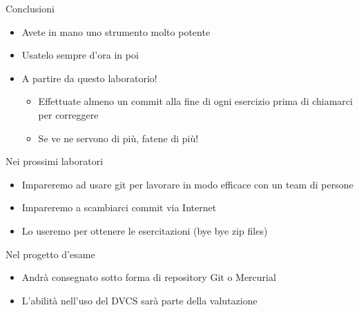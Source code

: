 \documentclass[xcolor=dvipsnames,presentation]{beamer}
\begin{document}
\begin{frame}{Conclusioni}
	\begin{itemize}
		\item Avete in mano uno strumento molto potente
		\item Usatelo sempre d'ora in poi
		\item A partire da questo laboratorio!
		\begin{itemize}
			\item Effettuate almeno un commit alla fine di ogni esercizio prima di chiamarci per correggere
			\item Se ve ne servono di più, fatene di più!
		\end{itemize}
	\end{itemize}
	\begin{block}{Nei prossimi laboratori}
		\begin{itemize}
			\item Impareremo ad usare git per lavorare in modo efficace con un team di persone
			\item Impareremo a scambiarci commit via Internet
			\item Lo useremo per ottenere le esercitazioni (bye bye zip files)
		\end{itemize}
	\end{block}
	\begin{block}{Nel progetto d'esame}
		\begin{itemize}
			\item Andrà consegnato sotto forma di repository Git o Mercurial
			\item L'abilità nell'uso del DVCS sarà parte della valutazione
		\end{itemize}
	\end{block}
\end{frame}
\end{document}
